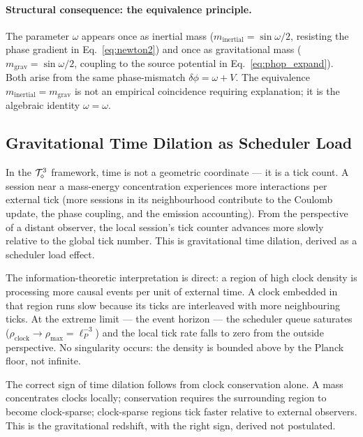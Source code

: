 \paragraph{Structural consequence: the equivalence principle.}
The parameter $\omega$ appears once as inertial mass
($m_\mathrm{inertial} = \sin\omega/2$, resisting the phase gradient in
Eq.~\eqref{eq:newton2}) and once as gravitational mass
($m_\mathrm{grav} = \sin\omega/2$, coupling to the source potential in
Eq.~\eqref{eq:phop_expand}).
Both arise from the same phase-mismatch $\delta\phi = \omega + V$.
The equivalence $m_\mathrm{inertial} = m_\mathrm{grav}$ is not an
empirical coincidence requiring explanation; it is the algebraic
identity $\omega = \omega$.

\subsection{Gravitational Time Dilation as Scheduler Load}
\label{subsec:time_dilation}

In the $\mathcal{T}_\diamond^3$ framework, time is not a geometric coordinate --- it
is a tick count.
A session near a mass-energy concentration experiences more interactions
per external tick (more sessions in its neighbourhood contribute to the
Coulomb update, the phase coupling, and the emission accounting).
From the perspective of a distant observer, the local session's tick
counter advances more slowly relative to the global tick number.
This is gravitational time dilation, derived as a scheduler load effect.

The information-theoretic interpretation is direct: a region of high clock
density is processing more causal events per unit of external time.
A clock embedded in that region runs slow because its ticks are interleaved
with more neighbouring ticks.
At the extreme limit --- the event horizon --- the scheduler queue saturates
($\rho_\text{clock} \to \rho_\text{max} = \ell_P^{-3}$) and the local
tick rate falls to zero from the outside perspective.
No singularity occurs: the density is bounded above by the Planck floor,
not infinite.

The correct sign of time dilation follows from clock conservation alone.
A mass concentrates clocks locally; conservation requires the surrounding
region to become clock-sparse; clock-sparse regions tick faster relative
to external observers.
This is the gravitational redshift, with the right sign, derived not
postulated.

